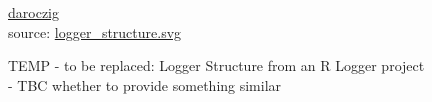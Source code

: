 \begin{figure}
    {\textcopyright \href{{https://twitter.com/daroczig}}{daroczig}\\source: \href{https://github.com/daroczig/logger/blob/master/vignettes/logger_structure.svg}{logger\_structure.svg}}
    \caption{TEMP - to be replaced: Logger Structure from an R Logger project - TBC whether to provide something similar}
    \label{fig:temp_logger_structure}
\end{figure}

